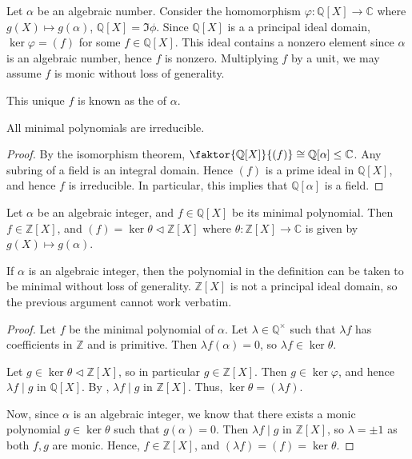 \begin{definition}
	Let $\alpha$ be an algebraic number.
	Consider the homomorphism $\varphi : \mathbb Q[X] \to \mathbb C$ where $g(X) \mapsto g(\alpha)$, $\mathbb{Q}[X] = \Im \phi$.
	Since $\mathbb Q[X]$ is a a principal ideal domain, $\ker \varphi = (f)$ for some $f \in \mathbb Q[X]$.
	This ideal contains a nonzero element since $\alpha$ is an algebraic number, hence $f$ is nonzero.
	Multiplying $f$ by a unit, we may assume $f$ is monic without loss of generality.

	This unique $f$ is known as the  of $\alpha$.
\end{definition} 

\begin{corollary}
	All minimal polynomials are irreducible.
\end{corollary}

\begin{proof}
	By the isomorphism theorem, $\faktor{\mathbb Q[X]}{(f)} \cong \mathbb Q[\alpha] \leq \mathbb C$.
	Any subring of a field is an integral domain.
	Hence $(f)$ is a prime ideal in $\mathbb Q[X]$, and hence $f$ is irreducible.
	In particular, this implies that $\mathbb Q[\alpha]$ is a field.
\end{proof} 

\begin{proposition} \label{12.4}
	Let $\alpha$ be an algebraic integer, and $f \in \mathbb Q[X]$ be its minimal polynomial.
	Then $f \in \mathbb Z[X]$, and $(f) = \ker \theta \triangleleft \mathbb Z[X]$ where $\theta : \mathbb Z[X] \to \mathbb C$ is given by $g(X) \mapsto g(\alpha)$.
\end{proposition}

\begin{remark}
	If $\alpha$ is an algebraic integer, then the polynomial in the definition can be taken to be minimal without loss of generality.
	$\mathbb Z[X]$ is not a principal ideal domain, so the previous argument cannot work verbatim.
\end{remark}

\begin{proof}
	Let $f$ be the minimal polynomial of $\alpha$.
	Let $\lambda \in \mathbb Q^\times$ such that $\lambda f$ has coefficients in $\mathbb Z$ and is primitive.
	Then $\lambda f(\alpha) = 0$, so $\lambda f \in \ker \theta$.

	Let $g \in \ker \theta \triangleleft \mathbb{Z}[X]$, so in particular $g \in \mathbb Z[X]$.
	Then $g \in \ker \varphi$, and hence $\lambda f \mid g$ in $\mathbb Q[X]$.
	By , $\lambda f \mid g$ in $\mathbb Z[X]$.
	Thus, $\ker \theta = (\lambda f)$.

	Now, since $\alpha$ is an algebraic integer, we know that there exists a monic polynomial $g \in \ker \theta$ such that $g(\alpha) = 0$.
	Then $\lambda f \mid g$ in $\mathbb Z[X]$, so $\lambda = \pm 1$ as both $f, g$ are monic.
	Hence, $f \in \mathbb Z[X]$, and $(\lambda f) = (f) = \ker \theta$.
\end{proof}

